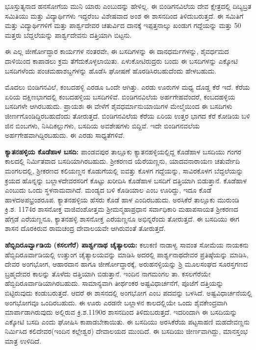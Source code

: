 ಭೂಸ್ತುತ್ಯನಾದ ಹನಸೋಗೆಯ ಮುನಿ ಯಾರು ಎಂಬುದನ್ನು ಹೇಳಿಲ್ಲ. ಈ ಬಿಂಡಿಗನವಿಲೆಯ ದೇವ ಕ್ಷೇತ್ರದಲ್ಲಿ ದಿಬ್ಯಬ್ರತ ಸಮಿತಿಯು ಮತ್ತು ವಿದ್ಯಾರ್ಥಿಗಳು ಇದ್ದರೆಂಬ ವಿಶೇಷವಾದ ಅಂಶ ಈ ಶಾಸನದಿಂದ ತಿಳಿದುಬರುತ್ತದೆ. ಈ ಸಮಿತಿಗೆ ಮತ್ತು ವಿದ್ಯಾರ್ಥಿಗಳಿಗೆ ಮತ್ತು ಪಾರ್ಶ್ವದೇವರ ಚತುರ್ವಿದ ದಾನಕ್ಕೆ ಇಪ್ಪತ್ತನಾಲ್ಕು ಖಂಡುಗ ಗದ್ದೆಯನ್ನು ಮತ್ತು 50 ಮತ್ತರು ಬೆದ್ದಲೆಯನ್ನು ಪಾರ್ಶ್ವದೇವನು ದತ್ತಿಯಾಗಿ ಬಿಟ್ಟನು.

ಈ ಎಲ್ಲ ಜೀರ್ಣೋದ್ಧಾರ ಕಾರ್ಯಗಳ ನಂತರವೇ, ಈ ಬಸದಿಗಳನ್ನು ಈ ದಾನಧರ್ಮಗಳನ್ನು, ಶೈವರ್ಧಮದ ದಾಳಿಯಿಂದ ಕಾಪಾಡಲು ಕ್ರಮ ತೆಗೆದುಕೊಳ್ಳಲಾಯಿತು. ಏಳುಕೋಟಿರುದ್ರರು ಬಂದು ಈ ಬಸದಿಗಳನ್ನು ಎಕ್ಕೋಟಿ ಬಸದಿಗಳೆಂದು ಪಂಚಮಹಾಶಬ್ದಗಳನ್ನು ಹೊಡೆಸಿ ಘೋಷಣೆ ಹೊರಡಿಸಿರಬಹುದೆಂದು ಹೇಳಬಹುದು.

ಮೊದಲು ಬಿಂಡಿಗನವಿಲೆ, ಕಂಬದಹಳ್ಳಿ ಎರಡೂ ಒಂದೇ ಆಗಿತ್ತು. ಎರಡು ಊರುಗಳ ಮಧ್ಯ ದೊಡ್ಡ ಕೆರೆ ಇದೆ. ಕೆರೆಯ ಏರಿಯ ದಕ್ಷಿಣಭಾಗದಲ್ಲಿ ಕಂಬದಹಳ್ಳಿಯ ಬಸದಿಗಳಿವೆ. ಬಿಂಡಿಗನವಿಲೆಯ ಅರ್ಹಗೇಹವೆಂದರೆ, ಕಂಬದಹಳ್ಳಿಯ ಬಸದಿಗಳೇ ಆಗಿರಬಹುದು. ಪ್ರಾಯಶಃ ಈ ವೇಳೆಗೆ ಶೈವಧರ್ಮಾನುಯಾಯಿಗಳ ಮೇಲ್ಮೆಯಿಂದ ಈ ಬಸದಿಗಳು ಜೀರ್ಣಗೊಂಡಿದ್ದಿರಬಹುದೆಂದು ತೋರುತ್ತದೆ. ಬಿಂಡಿಗನವಿಲೆಯ ಕೆರೆಯ ಏರಿಯ ಉತ್ತರ ಭಾಗದ ಕೆರೆ ಕೋಡಿಯ ಬಳಿ ಜಿನ ಬಿಂಬಗಳು, ನಿಸಿದಿಕಲ್ಲುಗಳು, ಬಸದಿಯ ಅವಶೇಷಗಳು ಬಿದ್ದಿವೆ. ಇದೇ ಬಿಂಡಿಗನವಲೆಯ ಅರ್ಹಗೇಹವಾಗಿದ್ದಿರ\-ಬಹುದು. ಈ ಎರಡು ಸಾಧ್ಯತೆಗಳಿವೆ.

\textbf{ಕ್ಯಾತನಹಳ್ಳಿಯ ಕೊಡೆಹಾಳ ಬಸದಿ:} ಪಾಂಡವಪುರ ತಾಲ್ಲೂಕು ಕ್ಯಾತನಹಳ್ಳಿಯಲ್ಲಿದ್ದ ಕೊಡೆಹಾಳ ಬಸದಿಯು ಗಂಗರ ಕಾಲದಲ್ಲಿ ನಿರ್ಮಿತವಾದ ಬಸದಿಯಾಗಿರಬಹುದು. ಶ‍್ರೀಕರಣದ ಯೆರೆಯಣ್ಣನು, ಯಾದವನಾರಾಯಣ ಚತುರ್ವೇದಿ ಮಂಗಲದಲ್ಲಿ, ಶ‍್ರೀಕರಣದ ಕಲಿಯಣ್ಣನ ಕೊಡುಗೆಯಲ್ಲಿ ಐವತ್ತು ಕೊಳಗ ಗದ್ದೆಯನ್ನು, ಸಾವಿರಕೊಳಗ ಬೆದ್ದಲೆಯನ್ನು ಕ್ರಯದ ಹೊನ್ನನ್ನು ಬಲ್ಲಾಳದೇವರಸ\-ರಿಗೆ ಕೊಟ್ಟು ಖರೀದಿಸಿ ಕೊಡೆಹಾಳ ಬಸದಿಗೆ ದತ್ತಿಯಾಗಿ ಬಿಡುತ್ತಾನೆ. ಕೊಡೆಹಾಳ ಎಂಬುದು ಒಂದು ಸ್ಥಳನಾಮವಾಗಿದೆ. ಮಂಡ್ಯದ ಬಳಿ ಕೊಡಿಯಾಲ ಎಂಬ ಊರಿದ್ದು, ಇದೂ ಕೊಡೆ ಹಾಳದ\break ಅಪಭ್ರಂಶರೂಪ. ಕ್ಯಾತನಹಳ್ಳಿಯ ಹೆಸರು ಕೊಡೆ ಹಾಳ ಎಂದಿರಬಹುದು. ಅರಸಿಕೆರೆ ತಾಲ್ಲೂಕು ಮುರುಂಡಿ ಕ್ರಿ.ಶ. 1174ರ ಶಾಸನೋಕ್ತ ವಾಜಿವಂಶೋತ್ತಮ ಶ‍್ರೀಮನ್ಮಹಾಪ್ರಧಾನ ಸರ್ವಾಧಿಕಾರಿ ಮಹಾಪಸಾಯತ ಶ‍್ರೀಕರಣದ ಹೆಗ್ಗಡೆ ಎರೆಯಣ್ಣನೂ, ಕ್ಯಾತನಹಳ್ಳಿ ಶಾಸನೋಕ್ತ ಎರೆಯಣ್ಣನೂ ಅಭಿನ್ನರೆಂದು ತೋರುತ್ತದೆ. ಈ ಬಸದಿಯು ಈಗ ಶಾಸನ ದೊರಕಿರುವ ರಾಮಚಂದ್ರ ದೇವಾಲಯವೇ ಆಗಿರುವಂತೆ ತೋರುತ್ತದೆ.

\textbf{ಹೆಬ್ಬಿದಿರೂರ್ವ್ವಾಡಿಯ (ಕಸಲಗೆರೆ) ಪಾರ್ಶ್ವನಾಥ ಚೈತ್ಯಾಲಯ:} ಕಲುಕಣಿ ನಾಡಾಳ್ವ ಸಾವಂತ ಸೋಮೆಯ ನಾಯಕನು ಹೆಬ್ಬಿದಿರೂರ್ವಾಡಿಯಲ್ಲಿ ಉತ್ತುಂಗ ಚೈತ್ಯಾಲಯವನ್ನು ಮಾಡಿಸಿ ಅದರಲ್ಲಿ ಪಾರ್ಶ್ವನಾಥದೇವರ ಪ್ರತಿಷ್ಠೆಯನ್ನು ಮಾಡಿಸಿ, ದೇವರ ಅಂಗಭೋಗ, ಆಹಾರದಾನ ಹಾಗೂ ಜೀರ್ಣೋದ್ಧಾರಕ್ಕೆ, ಅರುಹನಳ್ಳಿಯನ್ನು ಶ್ರಿ ಮೂಲಸಂಘದ ಸೂರಸ್ತಗಣದ ಬ್ರಹ್ಮದೇವರ ಕಾಲನ್ನು ತೊಳೆದು ದತ್ತಿಯಾಗಿ ಬಿಡುತ್ತಾನೆ. ಇಂದಿನ ನಾಗಮಂಗಲ ತಾ. ಕಸಲಗೆರೆಯೇ ಹೆಬ್ಬಿದಿರೂರ್ವಾಡಿಯಾಗಿರ\-ಬಹುದು. ಸಾಮಾನ್ಯವಾಗಿ ತೀರ್ಥಂಕರ ಅಷ್ಟವಿಧಾರ್ಚನೆಗೆ, ಪೂಜೆಗೆ ದತ್ತಿಯನ್ನು ಬಿಟ್ಟಿರುವುದು ಕಂಡುಬರುತ್ತದೆ. ಆದರೆ ಈ ಶಾಸನದಲ್ಲಿ ಅಂಗಭೋಗ ಎಂಬ ಪದವನ್ನು ಬಳಸಿದೆ. ಅಷ್ಟವಿಧಾರ್ಚನೆಯಲ್ಲಿ ಅಂಗಭೋಗವೂ ಒಂದಿರಬಹುದು. ಈ ಊರು ಎರಡನೇ ಬಲ್ಲಾಳನ ಕಾಲದಲ್ಲಿಯೇ ಒಂದು ಶೈವಕೇಂದ್ರವಾಗಿ ಮಾರ್ಪಾಡಾಗಿರುವುದು ಅಲ್ಲಿರುವ ಕ್ರಿ.ಶ.1190ರ ಶಾಸನದಿಂದ ತಿಳಿದುಬರುತ್ತದೆ. ಇದರಿಂದಾಗಿ ಈ ಬಸದಿಯನ್ನು ಎಕ್ಕೋಟಿ ಬಸದಿ ಎಂದು ಘೋಷಿಸಿ ಕಾಪಾಡಬೇಕಾಯಿತು. ಈ ಬಸದಿಯು ಅರಸಿಕೆರೆಯ ಪಟ್ಟಸಾಹಣಿ ಮಹದೇವಣ್ಣನು ನಿರ್ಮಿಸಿದ ಕಲಿದೇವರ(ಇಂದಿನ ಕಲ್ಲೇಶ್ವರ) ದೇವಾಲಯದ ಮುಂದಿದೆ. ಈ ಬಸದಿಯು ಜೀರ್ಣವಾಗಿದ್ದು, ಮಾನಸ್ತಂಭ ಮಾತ್ರ ಉಳಿದಿದೆ.

